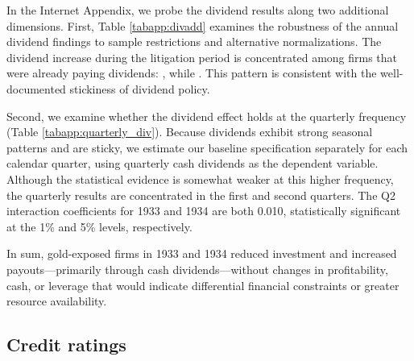 In the Internet Appendix, we probe the dividend results along two additional dimensions. First, Table \ref{tabapp:divadd} examines the robustness of the annual dividend findings to sample restrictions and alternative normalizations. The dividend increase during the litigation period is concentrated among firms that were already paying dividends: , while . This pattern is consistent with the well-documented stickiness of dividend policy. 

Second, we examine whether the dividend effect holds at the quarterly frequency (Table \ref{tabapp:quarterly_div}). Because dividends exhibit strong seasonal patterns and are sticky, we estimate our baseline specification separately for each calendar quarter, using quarterly cash dividends as the dependent variable. Although the statistical evidence is somewhat weaker at this higher frequency, the quarterly results are concentrated in the first and second quarters. The Q2 interaction coefficients for 1933 and 1934 are both 0.010, statistically significant at the 1\% and 5\% levels, respectively.

In sum, gold-exposed firms in 1933 and 1934 reduced investment and increased payouts---primarily through cash dividends---without changes in profitability, cash, or leverage that would indicate differential financial constraints or greater resource availability.

\subsection{Credit ratings}
\label{sec:rating}

